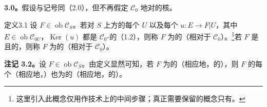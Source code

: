 \textbf{3.0。}假设与记号同（2.0），但不再假定 $\mathcal C_0$ 地对的核。

\begin{SGAresult}{定义}{3.1}
设 $F\in\operatorname{ob}\mathcal C_S$。若对 $S$ 上方的每个 $U$ 以及每个 $u:E\to F|U$，其中 $E\in\operatorname{ob}\mathcal C_{0U}$，$\operatorname{Ker}(u)$ 都是 $\mathcal C_0$-的（1.2），则称 $F$ 为的（相对于 $\mathcal C_0$）。\footnote{这里引入此概念仅用作技术上的中间步骤；真正需要保留的概念只有。}若 $F$ 是且的，则称 $F$ 为的（相对于 $\mathcal C_0$）。
\end{SGAresult}

\textbf{注记 3.2。}设 $F\in\operatorname{ob}\mathcal C_S$。由定义显然可知，若 $F$ 为的（相应地，的），则 $F$ 的每个（相应地，）也为的（相应地，的）。

